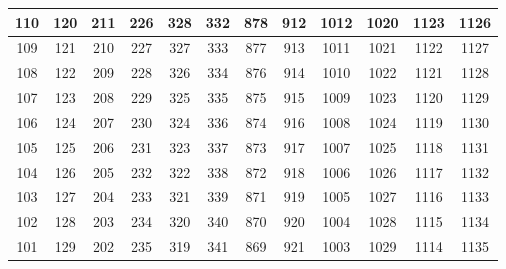 \begin{table}
\begin{center}
{\begin{tabular} {| c | c | c | c | c | c | c | c | c | c | c | c | }
110                      & 120                      &  211 & 226 & 328                      & 332                      & 878 & 912                      & 1012                      & 1020 & 1123                       & 1126                      \\ \hline
109                      & 121                      &  210 & 227 & 327                      & 333                      & 877 & 913                      & 1011                      & 1021 & 1122                       & 1127                      \\ \hline
\cellcolor{red!25}108 & \cellcolor{red!25}122 &  209 & 228 & \cellcolor{red!25}326 & \cellcolor{red!25}334 & 876 & \cellcolor{red!25}914 & \cellcolor{red!25}1010 & 1022 & \cellcolor{red!25}1121  & \cellcolor{red!25}1128 \\ \hline
\cellcolor{red!25}107 & \cellcolor{red!25}123 &  208 & 229 & \cellcolor{red!25}325 & \cellcolor{red!25}335 & 875 & \cellcolor{red!25}915 & \cellcolor{red!25}1009 & 1023 & \cellcolor{red!25}1120  & \cellcolor{red!25}1129 \\ \hline
\cellcolor{red!25}106 & \cellcolor{red!25}124 &  207 & 230 & \cellcolor{red!25}324 & \cellcolor{red!25}336 & 874 & \cellcolor{red!25}916 & \cellcolor{red!25}1008 & 1024 & \cellcolor{red!25}1119  & \cellcolor{red!25}1130 \\ \hline
\cellcolor{red!25}105 & \cellcolor{red!25}125 &  206 & 231 & \cellcolor{red!25}323 & \cellcolor{red!25}337 & 873 & \cellcolor{red!25}917 & \cellcolor{red!25}1007 & 1025 & \cellcolor{red!25}1118  & \cellcolor{red!25}1131 \\ \hline
\cellcolor{red!25}104 & \cellcolor{red!25}126 &  205 & 232 & \cellcolor{red!25}322 & \cellcolor{red!25}338 & 872 & \cellcolor{red!25}918 & \cellcolor{red!25}1006 & 1026 & \cellcolor{red!25}1117  & \cellcolor{red!25}1132 \\ \hline
\cellcolor{red!25}103 & \cellcolor{red!25}127 &  204 & 233 & \cellcolor{red!25}321 & \cellcolor{red!25}339 & 871 & \cellcolor{red!25}919 & \cellcolor{red!25}1005 & 1027 & \cellcolor{red!25}1116  & \cellcolor{red!25}1133 \\ \hline
\cellcolor{red!25}102 & \cellcolor{red!25}128 &  203 & 234 & \cellcolor{red!25}320 & \cellcolor{red!25}340 & 870 & \cellcolor{red!25}920 & \cellcolor{red!25}1004 & 1028 & \cellcolor{red!25}1115  & \cellcolor{red!25}1134 \\ \hline
\cellcolor{red!25}101 & \cellcolor{red!25}129 &  202 & 235 & \cellcolor{red!25}319 & \cellcolor{red!25}341 & 869 & \cellcolor{red!25}921 & \cellcolor{red!25}1003 & 1029 & \cellcolor{red!25}1114  & \cellcolor{red!25}1135 \\ \hline

\end{tabular}}
\end{center}
\end{table}
